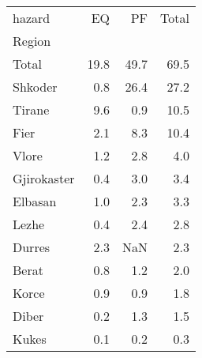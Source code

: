 \begin{tabular}{lrrr}
\toprule
hazard &    EQ &    PF &  Total \\
Region      &       &       &        \\
\midrule
Total       &  19.8 &  49.7 &   69.5 \\
Shkoder     &   0.8 &  26.4 &   27.2 \\
Tirane      &   9.6 &   0.9 &   10.5 \\
Fier        &   2.1 &   8.3 &   10.4 \\
Vlore       &   1.2 &   2.8 &    4.0 \\
Gjirokaster &   0.4 &   3.0 &    3.4 \\
Elbasan     &   1.0 &   2.3 &    3.3 \\
Lezhe       &   0.4 &   2.4 &    2.8 \\
Durres      &   2.3 &   NaN &    2.3 \\
Berat       &   0.8 &   1.2 &    2.0 \\
Korce       &   0.9 &   0.9 &    1.8 \\
Diber       &   0.2 &   1.3 &    1.5 \\
Kukes       &   0.1 &   0.2 &    0.3 \\
\bottomrule
\end{tabular}
